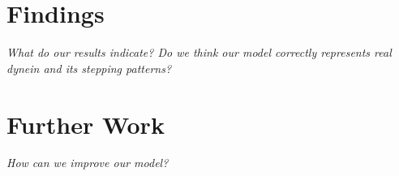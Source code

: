 \section{Findings}
\textit{What do our results indicate? Do we think our model correctly represents real dynein and its stepping patterns?}


\section{Further Work}
\textit{How can we improve our model?}